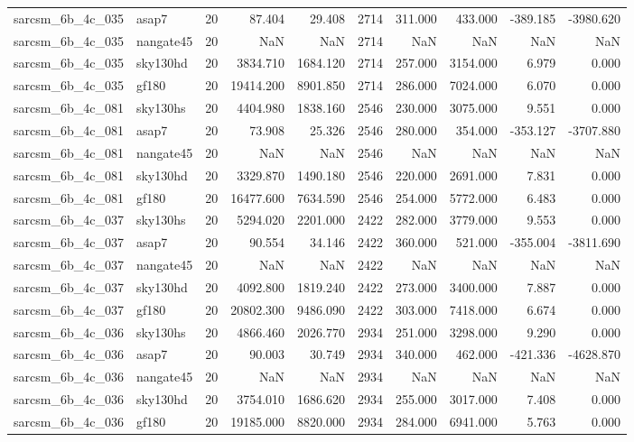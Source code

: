 \begin{longtable}{llrrrrrrrr}
sarcsm\_6b\_4c\_035 & asap7 & 20 & 87.404 & 29.408 & 2714 & 311.000 & 433.000 & -389.185 & -3980.620 \\
sarcsm\_6b\_4c\_035 & nangate45 & 20 & NaN & NaN & 2714 & NaN & NaN & NaN & NaN \\
sarcsm\_6b\_4c\_035 & sky130hd & 20 & 3834.710 & 1684.120 & 2714 & 257.000 & 3154.000 & 6.979 & 0.000 \\
sarcsm\_6b\_4c\_035 & gf180 & 20 & 19414.200 & 8901.850 & 2714 & 286.000 & 7024.000 & 6.070 & 0.000 \\
sarcsm\_6b\_4c\_081 & sky130hs & 20 & 4404.980 & 1838.160 & 2546 & 230.000 & 3075.000 & 9.551 & 0.000 \\
sarcsm\_6b\_4c\_081 & asap7 & 20 & 73.908 & 25.326 & 2546 & 280.000 & 354.000 & -353.127 & -3707.880 \\
sarcsm\_6b\_4c\_081 & nangate45 & 20 & NaN & NaN & 2546 & NaN & NaN & NaN & NaN \\
sarcsm\_6b\_4c\_081 & sky130hd & 20 & 3329.870 & 1490.180 & 2546 & 220.000 & 2691.000 & 7.831 & 0.000 \\
sarcsm\_6b\_4c\_081 & gf180 & 20 & 16477.600 & 7634.590 & 2546 & 254.000 & 5772.000 & 6.483 & 0.000 \\
sarcsm\_6b\_4c\_037 & sky130hs & 20 & 5294.020 & 2201.000 & 2422 & 282.000 & 3779.000 & 9.553 & 0.000 \\
sarcsm\_6b\_4c\_037 & asap7 & 20 & 90.554 & 34.146 & 2422 & 360.000 & 521.000 & -355.004 & -3811.690 \\
sarcsm\_6b\_4c\_037 & nangate45 & 20 & NaN & NaN & 2422 & NaN & NaN & NaN & NaN \\
sarcsm\_6b\_4c\_037 & sky130hd & 20 & 4092.800 & 1819.240 & 2422 & 273.000 & 3400.000 & 7.887 & 0.000 \\
sarcsm\_6b\_4c\_037 & gf180 & 20 & 20802.300 & 9486.090 & 2422 & 303.000 & 7418.000 & 6.674 & 0.000 \\
sarcsm\_6b\_4c\_036 & sky130hs & 20 & 4866.460 & 2026.770 & 2934 & 251.000 & 3298.000 & 9.290 & 0.000 \\
sarcsm\_6b\_4c\_036 & asap7 & 20 & 90.003 & 30.749 & 2934 & 340.000 & 462.000 & -421.336 & -4628.870 \\
sarcsm\_6b\_4c\_036 & nangate45 & 20 & NaN & NaN & 2934 & NaN & NaN & NaN & NaN \\
sarcsm\_6b\_4c\_036 & sky130hd & 20 & 3754.010 & 1686.620 & 2934 & 255.000 & 3017.000 & 7.408 & 0.000 \\
sarcsm\_6b\_4c\_036 & gf180 & 20 & 19185.000 & 8820.000 & 2934 & 284.000 & 6941.000 & 5.763 & 0.000 \\

\end{longtable}
